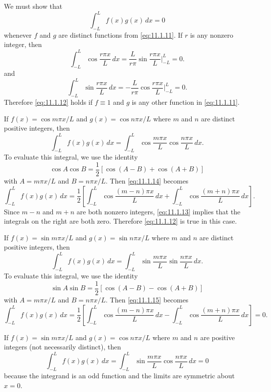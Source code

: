\begin{examplesolution}
\solution We must show that
\begin{equation}
  \label{eq:11.1.12}\int_{-L}^{L}f(x)g(x)\,dx=0
\end{equation}
whenever $f$ and $g$ are distinct functions from \eqref{eq:11.1.11}. If $r$ is any nonzero integer,
then
\begin{equation}
  \label{eq:11.1.13}\int_{-L}^{L}\cos\frac{r\pi x}{L}\,dx =\frac{L}{r\pi}\sin\frac{r\pi x}{L}\bigg|_{-L}^{L}=0.
\end{equation}
and
\[
  \int_{-L}^{L}\sin\frac{r\pi x}{L}\,dx =-\frac{L}{r\pi}\cos\frac{r\pi x}{L}\bigg|_{-L}^{L}=0.
\]
Therefore \eqref{eq:11.1.12} holds if $f\equiv1$ and $g$ is any other function in
\eqref{eq:11.1.11}.

If $f(x)=\cos m\pi x/L$ and $g(x)=\cos n\pi x/L$ where $m$ and $n$ are distinct positive integers,
then
\begin{equation}
  \label{eq:11.1.14}\int_{-L}^{L}f(x)g(x)\,dx=\int_{-L}^{L}\cos\frac{m\pi x}{L}\cos\frac{n\pi x}{L}\,dx.
\end{equation}
To evaluate this integral, we use the identity
\[
  \cos A\cos B=\frac{1}{2}[\cos(A-B)+\cos(A+B)]
\]
with $A=m\pi x/L$ and $B=n\pi x/L$. Then \eqref{eq:11.1.14} becomes
\[
  \int_{-L}^{L}f(x)g(x)\,dx=\frac{1}{2}\left[\int_{-L}^{L}\cos\frac{(m-n)\pi x}{L}\,dx +\int_{-L}^{L}\cos\frac{(m+n)\pi x}{L}\,dx\right].
\]
Since $m-n$ and $m+n$ are both nonzero integers, \eqref{eq:11.1.13} implies that the integrals on
the right are both zero. Therefore \eqref{eq:11.1.12} is true in this case.

If $f(x)=\sin m\pi x/L$ and $g(x)=\sin n\pi x/L$ where $m$ and $n$ are distinct positive integers,
then
\begin{equation}
  \label{eq:11.1.15}\int_{-L}^{L}f(x)g(x)\,dx=\int_{-L}^{L}\sin\frac{m\pi x}{L}\sin\frac{n\pi x}{L}\,dx.
\end{equation}
To evaluate this integral, we use the identity
\[
  \sin A\sin B=\frac{1}{2}[\cos(A-B)-\cos(A+B)]
\]
with $A=m\pi x/L$ and $B=n\pi x/L$. Then \eqref{eq:11.1.15} becomes
\[
  \int_{-L}^{L}f(x)g(x)\,dx=\frac{1}{2}\left[\int_{-L}^{L}\cos\frac{(m-n)\pi x}{L}\,dx -\int_{-L}^{L}\cos\frac{(m+n)\pi x}{L}\,dx\right]=0.
\]

If $f(x)=\sin m\pi x/L$ and $g(x)=\cos n\pi x/L$ where $m$ and $n$ are positive integers (not
necessarily distinct), then
\[
  \int_{-L}^{L}f(x)g(x)\,dx=\int_{-L}^{L}\sin\frac{m\pi x}{L}\cos\frac{n\pi x}{L}\,dx=0
\]
because the integrand is an odd function and the limits are symmetric about $x=0$. \bbox
\end{examplesolution}

